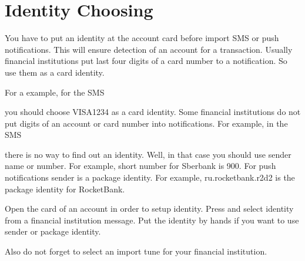 \documentclass[a4paper,10pt,english]{sphinxmanual}
\begin{document}
\section{Identity Choosing}
\label{\detokenize{account-identities:identity-choosing}}
\sphinxAtStartPar
You have to put an identity at the account card before import SMS or push notifications.
This will ensure detection of an account for a transaction. Usually financial institutions
put last four digits of a card number to a notification. So use them as a card identity.

\sphinxAtStartPar
For a example, for the SMS

\begin{sphinxVerbatim}[commandchars=\\\{\}]
        
\end{sphinxVerbatim}

\sphinxAtStartPar
you should choose VISA1234 as a card identity. Some financial institutions do not put
digits of an account or card number into notifications. For example, in the SMS

\begin{sphinxVerbatim}[commandchars=\\\{\}]
          
\end{sphinxVerbatim}

\sphinxAtStartPar
there is no way to find out an identity. Well, in that case you should use
sender name or number. For example, short number for Sberbank is 900.
For push notifications sender is a package identity. For example,
ru.rocketbank.r2d2 is the package identity for RocketBank.

\sphinxAtStartPar
Open the card of an account in order to setup identity. Press  and
select identity from a financial institution message. Put the identity by hands
if you want to use sender or package identity.

\sphinxAtStartPar
Also do not forget to select an import tune for your financial institution.

\noindent{}
\end{document}
